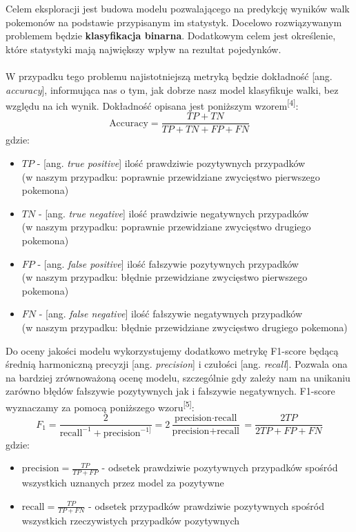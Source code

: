 \documentclass[12pt, a4paper]{report}
\begin{document}
Celem eksploracji jest budowa modelu pozwalającego na predykcję wyników walk pokemonów na podstawie przypisanym im statystyk. Docelowo rozwiązywanym problemem będzie \textbf{klasyfikacja binarna}. Dodatkowym celem jest określenie, które statystyki mają największy wpływ na rezultat pojedynków.\\\\
\noindent
W przypadku tego problemu najistotniejszą metryką będzie dokładność [ang. \textit{accuracy}], informująca nas o tym, jak dobrze nasz model klasyfikuje walki, bez względu na ich wynik. Dokładność opisana jest poniższym wzorem\textsuperscript{[4]}:
\[\text{Accuracy} = \frac{TP+TN}{TP+TN+FP+FN}\]
gdzie:
\begin{itemize}
    \item \(TP\) - [ang. \textit{true positive}] ilość prawdziwie pozytywnych przypadków\\ (w naszym przypadku: poprawnie przewidziane zwycięstwo pierwszego pokemona) 
\item \(TN\) - [ang. \textit{true negative}] ilość prawdziwie negatywnych przypadków\\ (w naszym przypadku: poprawnie przewidziane zwycięstwo drugiego pokemona)
\item \(FP\) - [ang. \textit{false positive}] ilość fałszywie pozytywnych przypadków\\ (w naszym przypadku: błędnie przewidziane zwycięstwo pierwszego pokemona)
\item \(FN\) - [ang. \textit{false negative}] ilość fałszywie negatywnych przypadków\\ (w naszym przypadku: błędnie przewidziane zwycięstwo drugiego pokemona)\\ 
\end{itemize}

\noindent
Do oceny jakości modelu wykorzystujemy dodatkowo metrykę F1-score będącą średnią harmoniczną precyzji [ang. \textit{precision}] i czułości [ang. \textit{recall}]. Pozwala ona na bardziej zrównoważoną ocenę modelu, szczególnie gdy zależy nam na unikaniu zarówno błędów fałszywie pozytywnych jak i fałszywie negatywnych. F1-score wyznaczamy za pomocą poniższego wzoru\textsuperscript{[5]}:
\[F_1 = \frac{2}{\text{recall}^{-1} + \text{precision}^{-1]}}=2\frac{\text{precision} \cdot \text{recall}}{\text{precision}+\text{recall}}=\frac{2TP}{2TP+FP+FN}\]
\noindent
gdzie:
\begin{itemize}
    \item \(\text{precision} = \frac{TP}{TP+FP}\) - odsetek prawdziwie pozytywnych przypadków spośród wszystkich uznanych przez model za pozytywne
    \item \(\text{recall} = \frac{TP}{TP+FN}\) - odsetek przypadków prawdziwie pozytywnych spośród wszystkich rzeczywistych przypadków pozytywnych
\end{itemize}
\end{document}
